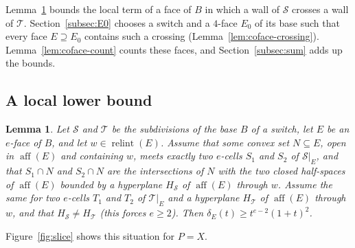 \documentclass[11pt]{article}
\newtheorem{lemma}[theorem]{Lemma}
\theoremstyle{definition}
\theoremstyle{remark}
\newcommand{\SSS}{\mathcal S}
\newcommand{\TT}{\mathcal T}
\newcommand{\relint}{\operatorname{relint}}
\newcommand{\aff}{\operatorname{aff}}
\begin{document}
Lemma~\ref{lem:crossing} bounds the local term of a face of $B$ in which a wall of
$\SSS$ crosses a wall of $\TT$. Section~\ref{subsec:E0} chooses a switch and a $4$-face
$E_0$ of its base such that every face $E\supseteq E_0$ contains such a crossing
(Lemma~\ref{lem:coface-crossing}). Lemma~\ref{lem:coface-count} counts these faces, and
Section~\ref{subsec:sum} adds up the bounds.

\subsection{A local lower bound}
\begin{lemma}\label{lem:crossing}
Let $\SSS$ and $\TT$ be the subdivisions of the base $B$ of a switch, let $E$
be an $e$-face of $B$, and let $w\in\relint(E)$. Assume that some convex set $N\subseteq E$, open in $\aff(E)$ and
containing $w$, meets exactly two $e$-cells $S_1$ and $S_2$ of $\SSS|_E$, and that
$S_1\cap N$ and $S_2\cap N$ are the intersections of $N$ with the two
closed half-spaces of $\aff(E)$ bounded by a hyperplane $H_\SSS$ of $\aff(E)$ through
$w$. Assume the same for two $e$-cells $T_1$ and $T_2$ of $\TT|_E$ and a
hyperplane $H_\TT$ of $\aff(E)$ through $w$, and that
$H_\SSS\neq H_\TT$ (this forces $e\geq2$). Then
$\delta_E(t)\geq t^{e-2}(1+t)^2$.
\end{lemma}
Figure~\ref{fig:slice} shows this situation for $P=X$.
\end{document}
